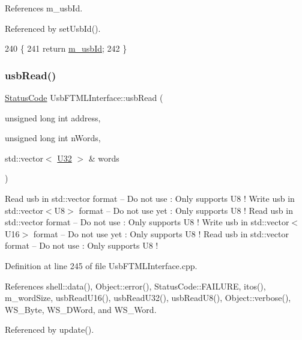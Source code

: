 References m\+\_\+usb\+Id.



Referenced by set\+Usb\+Id().


\begin{DoxyCode}
240                \{
241     \textcolor{keywordflow}{return} \hyperlink{classUsbFTMLInterface_aab6754587c303660d5c498ce34a2b4c8}{m\_usbId};
242   \}
\end{DoxyCode}
\mbox{\label{classUsbFTMLInterface_adbedf78154f460303edc20420c22c333}} 
\subsubsection{\texorpdfstring{usb\+Read()}{usbRead()}}
{\footnotesize\ttfamily \hyperlink{classStatusCode}{Status\+Code} Usb\+F\+T\+M\+L\+Interface\+::usb\+Read (\begin{DoxyParamCaption}\item[{unsigned long int}]{address,  }\item[{unsigned long int}]{n\+Words,  }\item[{std\+::vector$<$ \hyperlink{classUsbFTMLInterface_a142f8ce4b5873c295af8945f3894ae38}{U32} $>$ \&}]{words }\end{DoxyParamCaption})}

Read usb in std\+::vector format -- Do not use \+: Only supports U8 ! Write usb in std\+::vector$<$\+U8$>$ format -- Do not use yet \+: Only supports U8 ! Read usb in std\+::vector format -- Do not use \+: Only supports U8 ! Write usb in std\+::vector$<$\+U16$>$ format -- Do not use yet \+: Only supports U8 ! Read usb in std\+::vector format -- Do not use \+: Only supports U8 ! 

Definition at line 245 of file Usb\+F\+T\+M\+L\+Interface.\+cpp.



References shell\+::data(), Object\+::error(), Status\+Code\+::\+F\+A\+I\+L\+U\+RE, itos(), m\+\_\+word\+Size, usb\+Read\+U16(), usb\+Read\+U32(), usb\+Read\+U8(), Object\+::verbose(), W\+S\+\_\+\+Byte, W\+S\+\_\+\+D\+Word, and W\+S\+\_\+\+Word.



Referenced by update().


